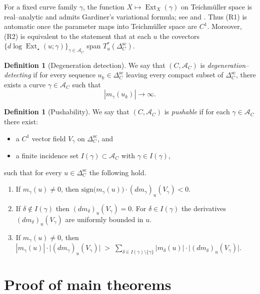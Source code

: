 \documentclass[a4paper,12pt]{amsart}
\DeclareMathOperator{\Ext}{Ext}
\theoremstyle{plain}
\theoremstyle{definition}
\newtheorem{definition}[theorem]{Definition}
\begin{document}
For a fixed curve family $\gamma$, the function $X\mapsto \Ext_X(\gamma)$ on Teichm\"uller space is real--analytic and admits
Gardiner’s variational formula; see \cite{Kerckhoff,GardinerQD,HubbardMasur} and \cite[Chapters~6--7]{GardinerLakic}.
Thus \textup{(R1)} is automatic once the parameter maps into Teichm\"uller space are $C^1$.
Moreover, \textup{(R2)} is equivalent to the statement that at each $u$ the covectors
$\{d\log\Ext_{\star}(u;\gamma)\}_{\gamma\in\mathcal A_C}$ span $T_u^\ast(\Delta_C^{\mathrm{sc}})$.


\begin{definition}[Degeneration detection]\label{def:DegDetect}
We say that $(C,\mathcal A_C)$ is \emph{degeneration--detecting} if for every sequence
$u_k\in\Delta_C^{\mathrm{sc}}$ leaving every compact subset of $\Delta_C^{\mathrm{sc}}$, there exists a curve
$\gamma\in\mathcal A_C$ such that
\[
|m_\gamma(u_k)|\longrightarrow\infty .
\]
\end{definition}

\begin{definition}[Pushability]\label{def:Pushable}
We say that $(C,\mathcal A_C)$ is \emph{pushable} if for each $\gamma\in\mathcal A_C$ there exist:
\begin{itemize}[leftmargin=2.2em]
\item a $C^1$ vector field $V_\gamma$ on $\Delta_C^{\mathrm{sc}}$, and
\item a finite incidence set $I(\gamma)\subset \mathcal A_C$ with $\gamma\in I(\gamma)$,
\end{itemize}
such that for every $u\in\Delta_C^{\mathrm{sc}}$ the following hold.
\begin{enumerate}[label=\textup{(P\arabic*)}, leftmargin=2.8em]
\item 
If $m_\gamma(u)\neq 0$, then
\(
\mathrm{sign}\bigl(m_\gamma(u)\bigr)\cdot (dm_\gamma)_u(V_\gamma) <0.
\)
\item 
If $\delta\notin I(\gamma)$ then $(dm_\delta)_u(V_\gamma)=0$. For $\delta\in I(\gamma)$ the derivatives
$(dm_\delta)_u(V_\gamma)$ are uniformly bounded in $u$.
\item 
If $m_\gamma(u)\neq 0$, then
\(
|m_\gamma(u)|\cdot\bigl|(dm_\gamma)_u(V_\gamma)\bigr|
\;>\;
\sum_{\delta\in I(\gamma)\setminus\{\gamma\}}
|m_\delta(u)|\cdot\bigl|(dm_\delta)_u(V_\gamma)\bigr|.
\)
\end{enumerate}
\end{definition}

\section{Proof of main theorems}\label{sec:proof_main}
\end{document}
